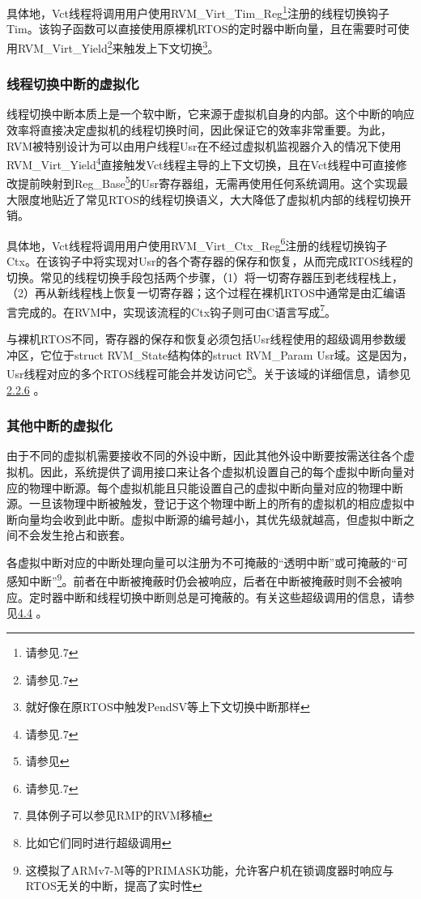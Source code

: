 具体地，Vct线程将调用用户使用RVM\_Virt\_Tim\_Reg\footnote{请参见.7}注册的线程切换钩子Tim。该钩子函数可以直接使用原裸机RTOS的定时器中断向量，且在需要时可使用RVM\_Virt\_Yield\footnote{请参见.7}来触发上下文切换\footnote{就好像在原RTOS中触发PendSV等上下文切换中断那样}。

\subsubsection{线程切换中断的虚拟化}\label{subsubsec:2-2-4-2}

线程切换中断本质上是一个软中断，它来源于虚拟机自身的内部。这个中断的响应效率将直接决定虚拟机的线程切换时间，因此保证它的效率非常重要。为此，RVM被特别设计为可以由用户线程Usr在不经过虚拟机监视器介入的情况下使用RVM\_Virt\_Yield\footnote{请参见.7}直接触发Vct线程主导的上下文切换，且在Vct线程中可直接修改提前映射到Reg\_Base\footnote{请参见}的Usr寄存器组，无需再使用任何系统调用。这个实现最大限度地贴近了常见RTOS的线程切换语义，大大降低了虚拟机内部的线程切换开销。

具体地，Vct线程将调用用户使用RVM\_Virt\_Ctx\_Reg\footnote{请参见.7}注册的线程切换钩子Ctx。在该钩子中将实现对Usr的各个寄存器的保存和恢复，从而完成RTOS线程的切换。常见的线程切换手段包括两个步骤，（1）将一切寄存器压到老线程栈上，（2）再从新线程栈上恢复一切寄存器；这个过程在裸机RTOS中通常是由汇编语言完成的。在RVM中，实现该流程的Ctx钩子则可由C语言写成\footnote{具体例子可以参见RMP的RVM移植}。

与裸机RTOS不同，寄存器的保存和恢复必须包括Usr线程使用的超级调用参数缓冲区，它位于struct
RVM\_State结构体的struct RVM\_Param
Usr域。这是因为，Usr线程对应的多个RTOS线程可能会并发访问它\footnote{比如它们同时进行超级调用}。关于该域的详细信息，请参见\protect\hyperref[subsec:2-2-6]{2.2.6}
。

\subsubsection{其他中断的虚拟化}\label{subsubsec:2-2-4-3}

由于不同的虚拟机需要接收不同的外设中断，因此其他外设中断要按需送往各个虚拟机。因此，系统提供了调用接口来让各个虚拟机设置自己的每个虚拟中断向量对应的物理中断源。每个虚拟机能且只能设置自己的虚拟中断向量对应的物理中断源。一旦该物理中断被触发，登记于这个物理中断上的所有的虚拟机的相应虚拟中断向量均会收到此中断。虚拟中断源的编号越小，其优先级就越高，但虚拟中断之间不会发生抢占和嵌套。

各虚拟中断对应的中断处理向量可以注册为不可掩蔽的``透明中断''或可掩蔽的``可感知中断''\footnote{这模拟了ARMv7-M等的PRIMASK功能，允许客户机在锁调度器时响应与RTOS无关的中断，提高了实时性}。前者在中断被掩蔽时仍会被响应，后者在中断被掩蔽时则不会被响应。定时器中断和线程切换中断则总是可掩蔽的。有关这些超级调用的信息，请参见\protect\hyperref[sec:4-4]{4.4}
。

